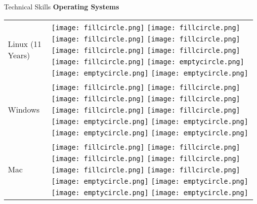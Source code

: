 \documentclass{resume}
\begin{document}
\begin{rSection}{Technical Skills}
{\bf Operating Systems }
\begin{table}[h!]
  \begin{tabular}{p{10cm}p{6cm}}
	Linux (11 Years) & 
  \texttt{[image: fillcircle.png]} 
  \texttt{[image: fillcircle.png]} 
  \texttt{[image: fillcircle.png]}
  \texttt{[image: fillcircle.png]} 
  \texttt{[image: fillcircle.png]}
  \texttt{[image: fillcircle.png]} 
  \texttt{[image: fillcircle.png]}
  \texttt{[image: emptycircle.png]} 
  \texttt{[image: emptycircle.png]} 
  \texttt{[image: emptycircle.png]} \\
	Windows & 
  \texttt{[image: fillcircle.png]} 
  \texttt{[image: fillcircle.png]} 
  \texttt{[image: fillcircle.png]}
  \texttt{[image: fillcircle.png]} 
  \texttt{[image: fillcircle.png]}
  \texttt{[image: fillcircle.png]} 
  \texttt{[image: emptycircle.png]}
  \texttt{[image: emptycircle.png]} 
  \texttt{[image: emptycircle.png]} 
  \texttt{[image: emptycircle.png]} \\
	Mac & 
  \texttt{[image: fillcircle.png]} 
  \texttt{[image: fillcircle.png]} 
  \texttt{[image: fillcircle.png]}
  \texttt{[image: fillcircle.png]} 
  \texttt{[image: fillcircle.png]}
  \texttt{[image: fillcircle.png]} 
  \texttt{[image: emptycircle.png]}
  \texttt{[image: emptycircle.png]} 
  \texttt{[image: emptycircle.png]} 
  \texttt{[image: emptycircle.png]} \\
  \end{tabular}
\end{table}
\end{rSection}
\end{document}
